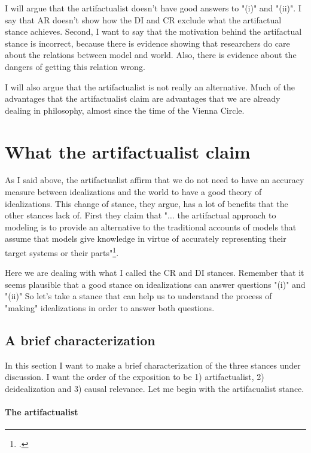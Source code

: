 I will argue that the artifactualist doesn't have good answers to "(i)" and "(ii)".
I say that AR doesn't show how the DI and CR exclude what the artifactual stance achieves.
Second, I want to say that the motivation behind the artifactual stance is incorrect, because there is evidence showing that researchers do care about the relations between model and world.
Also, there is evidence about the dangers of getting this relation wrong.

I will also argue that the artifactualist is not really an alternative.
Much of the advantages that the artifactualist claim are advantages that we are already dealing in philosophy, almost since the time of the Vienna Circle.


\section{What the artifactualist claim}

As I said above, the artifactualist affirm that we do not need to have an accuracy measure between idealizations and the world to have a good theory of idealizations.
This change of stance, they argue, has a lot of benefits that the other stances lack of.
First they claim that "$\ldots$ the artifactual approach to modeling is to provide an alternative to the traditional accounts of models that assume that models give knowledge in virtue of accurately representing their target systems or their parts"\footcite[][pp. 51-52]{Carrillo2022}.

Here we are dealing with what I called the CR and DI stances.
Remember that it seems plausible that a good stance on idealizations can answer questions "(i)" and "(ii)"
So let's take a stance that can help us to understand the process of "making" idealizations in order to answer both questions.


\subsection{A brief characterization}

In this section I want to make a brief characterization of the three stances under discussion.
I want the order of the exposition to be 1) artifactualist, 2) deidealization and 3) causal relevance.
Let me begin with the artifacualist stance.

\paragraph{The artifactualist}

